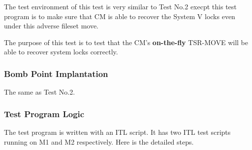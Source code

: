 The test environment of this test is very similar to Test No.2 execpt this
test program is to make sure that CM is able to recover the System V locks
even under this adverse fileset move.

The purpose of this test is to test that the CM's {\bf on-the-fly}
TSR-MOVE will be able to recover system locks correctly. 

\subsubsection {Bomb Point Implantation}

The same as Test No.2.

\subsubsection {Test Program Logic}

The test program is written with an ITL script. It has two ITL test scripts
running on M1 and M2 respectively. Here is the detailed steps. 

